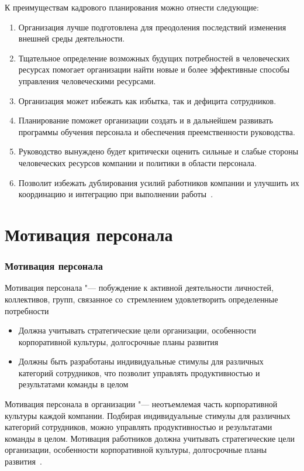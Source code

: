 \documentclass{../industrial-development}
\begin{document}
\lecturenotes

К преимуществам кадрового планирования можно отнести следующие:
  \begin{enumerate}
\item	Организация лучше подготовлена для преодоления последствий изменения внешней среды деятельности.
\item	Тщательное определение возможных будущих потребностей в человеческих ресурсах помогает организации найти новые и более эффективные способы управления человеческими ресурсами.
\item	Организация может избежать как избытка, так и дефицита сотрудников.
\item	Планирование поможет организации создать и в дальнейшем развивать программы обучения персонала и обеспечения преемственности руководства.
\item	Руководство вынуждено будет критически оценить сильные и слабые стороны человеческих ресурсов компании и политики в области персонала.
\item	Позволит избежать дублирования усилий работников компании и улучшить их координацию и интеграцию при выполнении работы~\cite[с.~89]{Ivanova}.
\end{enumerate}

\section{Мотивация персонала}
\begin{frame} \frametitle{Мотивация персонала}

\alert{Мотивация персонала} "--- побуждение к активной деятельности личностей, коллективов, групп, связанное со~стремлением удовлетворить определенные потребности
 \begin{itemize}
\item Должна учитывать стратегические цели организации, особенности корпоративной культуры, долгосрочные планы развития
\item Должны быть разработаны индивидуальные стимулы для различных категорий сотрудников, что позволит управлять продуктивностью и результатами команды в целом 
\end{itemize}

\end{frame}

\lecturenotes

Мотивация персонала в организации "--- неотъемлемая часть корпоративной культуры каждой компании. Подбирая индивидуальные стимулы для различных категорий сотрудников, можно управлять продуктивностью и результатами команды в целом. Мотивация работников должна учитывать стратегические цели организации, особенности корпоративной культуры, долгосрочные планы развития~\cite{MotivPerson}.
\end{document}
